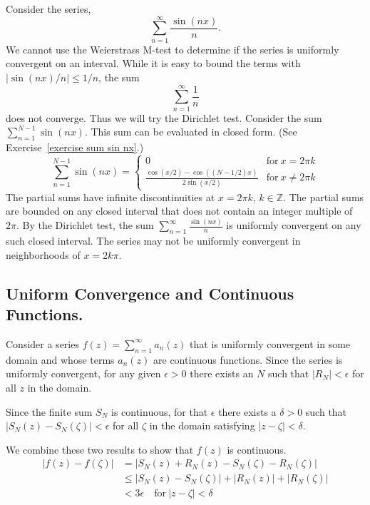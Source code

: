 \begin{Example}
  \label{uniform_convergence_sin_nx_n}
  Consider the series,
  \[
  \sum_{n = 1}^\infty \frac{\sin(n x)}{n}.
  \]
  We cannot use the Weierstrass M-test to determine if the series is
  uniformly convergent on an interval.  While it is easy to bound the terms
  with $|\sin(n x)/n| \leq 1/n$, the sum
  \[
  \sum_{n = 1}^\infty \frac{1}{n}
  \]
  does not converge.  Thus we will try the Dirichlet test.  Consider the
  sum $\sum_{n=1}^{N-1} \sin(n x)$.  This sum can be evaluated in closed form. 
  (See Exercise~\ref{exercise sum sin nx}.)
  \[
  \sum_{n=1}^{N-1} \sin(n x) 
  = \begin{cases}
    0 &\mathrm{for}\ x = 2 \pi k 
    \\
    \frac{ \cos(x/2) - \cos((N-1/2) x)} { 2 \sin(x/2) } 
    &\mathrm{for}\ x \neq 2 \pi k
  \end{cases} 
  \]
  The partial sums have infinite discontinuities at $x = 2 \pi k$, 
  $k \in \mathbb{Z}$.
  The partial sums are bounded on any closed interval 
  that does not contain an integer multiple of $2 \pi$.
  By the Dirichlet test, the sum $\sum_{n = 1}^\infty \frac{\sin(n x)}{n}$ is uniformly
  convergent on any such closed interval.  The series may not be uniformly
  convergent in neighborhoods of $x = 2 k \pi$.  
\end{Example}








\subsection{Uniform Convergence and Continuous Functions.}



Consider a series $f(z) = \sum_{n = 1}^\infty a_n(z)$ that is uniformly convergent
in some domain and whose terms $a_n(z)$ are continuous functions.  Since the
series is uniformly convergent, for any given $\epsilon > 0$ there exists
an $N$ such that $|R_N| < \epsilon$ for all $z$ in the
domain.

Since the finite sum $S_N$ is continuous, for that $\epsilon$
there exists a $\delta > 0$ such that 
$|S_N(z) - S_N(\zeta)| < \epsilon$ for all $\zeta$ in the domain satisfying $|z - \zeta| < \delta$.

We combine these two results to show that $f(z)$ is continuous.
\begin{align*}
  |f(z) - f(\zeta)|
  &= |S_N(z) + R_N(z) - S_N(\zeta) - R_N(\zeta)| 
  \\
  &\leq |S_N(z) - S_N(\zeta)| + |R_N(z)| + |R_N(\zeta)| 
  \\
  &< 3 \epsilon \quad \mathrm{for}\ |z - \zeta| < \delta
\end{align*}




